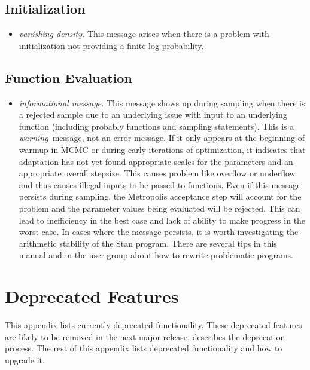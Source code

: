 \section{Initialization}

\begin{itemize}
\item {\it vanishing density.} This message arises when there is a
  problem with initialization not providing a finite log probability.
%
\end{itemize}

\section{Function Evaluation}

\begin{itemize}
\item {\it informational message.}  This message shows up during
  sampling when there is a rejected sample due to an underlying issue
  with input to an underlying function (including probably functions
  and sampling statements).  This is a {\it warning}\, message, not an
  error message.  If it only appears at the beginning of warmup in
  MCMC or during early iterations of optimization, it indicates that
  adaptation has not yet found appropriate scales for the parameters
  and an appropriate overall stepsize.  This causes problem like
  overflow or underflow and thus causes illegal inputs to be passed to
  functions.  Even if this message persists during sampling, the
  Metropolis acceptance step will account for the problem and the
  parameter values being evaluated will be rejected.  This can lead to
  inefficiency in the best case and lack of ability to make progress
  in the worst case.  In cases where the message persists, it is worth
  investigating the arithmetic stability of the Stan program.  There
  are several tips in this manual and in the user group about how to
  rewrite problematic programs.
\end{itemize}

\chapter{Deprecated Features}\label{deprecated-features.appendix}

\noindent
This appendix lists currently deprecated functionality.  These
deprecated features are likely to be removed in the next major
release.   describes the deprecation
process.  The rest of this appendix lists deprecated functionality and
how to upgrade it.

